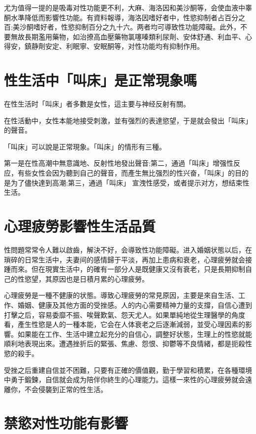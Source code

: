 \documentclass[12pt,UTF8]{ctexbook}
\begin{document}
尤为值得一提的是吸毒对性功能更不利，大麻、海洛因和美沙酮等，会使血液中睾酮水準降低而影響性功能。有資料報導，海洛因嗜好者中，性慾抑制者占百分之百;美沙酮嗜好者，性慾抑制百分之九十六。两者均可導致性功能障礙。此外，不要無故長期濫用藥物，如治撩高血壓藥物氯噻嗪類利尿劑、安体舒通、利血平、心得安，鎮静劑安定、利眠寧、安眠酮等，对性功能均有抑制作用。

\section{性生活中「叫床」是正常現象嗎}

在性生活时「叫床」者多數是女性，這主要与神经反射有關。

在性活動中，女性本能地接受刺激，並有强烈的表達慾望，于是就会發出「叫床」的聲音。

「叫床」可以說是正常現象。「叫床」的情形有三種。

第一是在性高潮中無意識地、反射性地發出聲音;第二，通過「叫床」增强性反应，有些女性会因为聽到自己的聲音，而產生無比强烈的性兴奋，「叫床」的目的是为了儘快達到高潮;第三，通過「叫床」
宣洩性感受，或者提示对方，想结束性生活。

\section{心理疲勞影響性生活品質}

性問題常常令人難以啟齒，解決不好，会導致性功能障礙。进入婚姻状態以后，在瑣碎的日常生活中，夫妻间的感情歸于平淡，再加上患病和衰老，心理疲勞就会接踵而來。但在現實生活中，的確有一部分人是既健康又沒有衰老，只是長期抑制自己的性慾望，其原因也是日積月累的心理疲勞。

心理疲勞是一種不健康的状態。導致心理疲勞的常見原因，主要是來自生活、工作、婚姻、健康及其他方面的受挫感。人的内心需要精神力量的支撐，自信心遭到打擊之后，容易委靡不振、唉聲歎氣、怨天尤人。如果單純地從生理醫學的角度看，產生性慾是人的一種本能，它会在人体衰老之后逐漸減弱，並受心理因素的影響。如果能在工作、生活中建立起充分的自信心，調整好状態，生理上的性慾就能順利地表現出來。遭遇挫折后的緊張、焦慮、怨恨、抑鬱等不良情緒，都是扼殺性慾的殺手。

受挫之后重建自信並不困難，只要有正確的價值觀，勤于學習和積累，在各種環境中勇于鍛鍊，自信就会成为陪伴你終生的心理能力。這樣一來性的心理疲勞就会遠離你，不会侵襲到正常的性生活。

\section{禁慾对性功能有影響}
\end{document}
